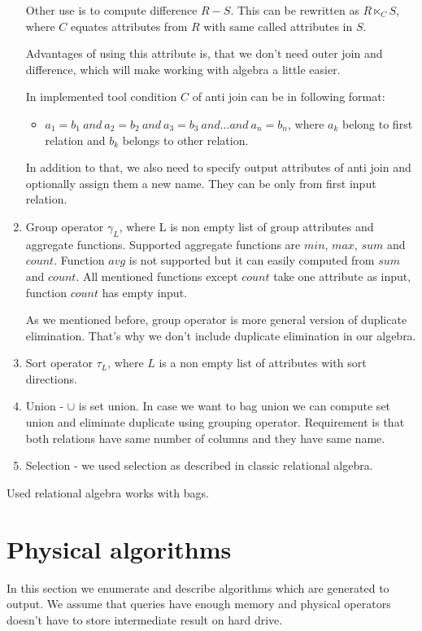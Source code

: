 \begin{enumerate}
Other use is to compute difference $R-S$. This can be rewritten as $R \ltimes_C S$, where $C$ equates attributes from $R$ with same called attributes in $S$. 
 
Advantages of using this attribute is, that we don't need outer join and difference, which will make working with algebra a little easier.

In implemented tool condition $C$ of anti join can be in following format:
\begin{itemize}
\item $a_1=b_1~and~a_2=b_2~and~a_3=b_3~and...and~a_n=b_n$, where $a_k$ belong to first relation and $b_k$ belongs to other relation.
\end{itemize}
In addition to that, we also need to specify output attributes of anti join and optionally assign them a new name. They can be only from first input relation.
\item Group operator $\gamma_L$, where L is non empty list of group attributes and aggregate functions. Supported aggregate functions are $min$, $max$, $sum$ and $count$. Function $avg$ is not supported but it can easily computed from $sum$ and $count$. All mentioned functions except $count$ take one attribute as input, function $count$ has empty input. 

As we mentioned before, group operator is more general version of duplicate elimination. That's why we don't include duplicate elimination in our algebra.
\item Sort operator $\tau_L$, where $L$ is a non empty list of attributes with sort directions.
\item Union - $\cup$ is set union. In case we want to bag union we can compute set union and eliminate duplicate using grouping operator. Requirement is that both relations have same number of columns and they have same name.
\item Selection - we used selection as described in classic relational algebra.

\end{enumerate}

Used relational algebra works with bags.

\section{Physical algorithms}

In this section we enumerate and describe algorithms which are generated to output. We assume that queries have enough memory and physical operators doesn't have to store intermediate result on hard drive.

